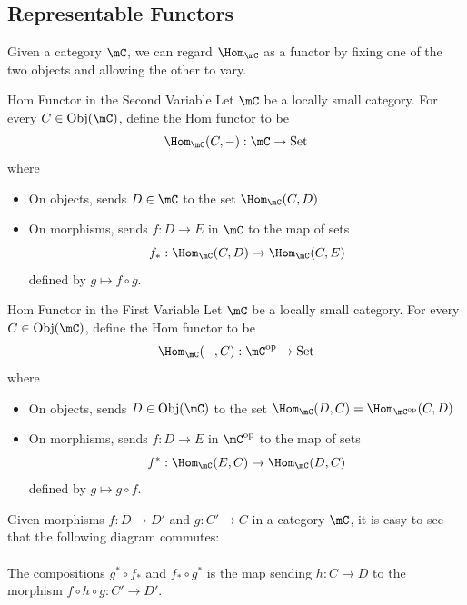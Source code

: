 \documentclass[a4paper]{article}
\begin{document}
\subsection{Representable Functors}
Given a category $\mC$, we can regard $\Hom_\mC$ as a functor by fixing one of the two objects and allowing the other to vary. 

\begin{defn}{Hom Functor in the Second Variable}{} Let $\mC$ be a locally small category. For every $C\in\text{Obj}(\mC)$, define the Hom functor to be $$\Hom_\mC(C,-):\mC\to\text{Set}$$ where 
\begin{itemize}
\item On objects, sends $D\in\mC$ to the set $\Hom_\mC(C,D)$
\item On morphisms, sends $f:D\to E$ in $\mC$ to the map of sets $$f_\ast:\Hom_\mC(C,D)\to\Hom_\mC(C,E)$$ defined by $g\mapsto f\circ g$. 
\end{itemize}
\end{defn}

\begin{defn}{Hom Functor in the First Variable}{} Let $\mC$ be a locally small category. For every $C\in\text{Obj}(\mC)$, define the Hom functor to be $$\Hom_\mC(-,C):\mC^\text{op}\to\text{Set}$$ where 
\begin{itemize}
\item On objects, sends $D\in\text{Obj}(\mC)$ to the set $\Hom_\mC(D,C)=\Hom_{\mC^{\text{op}}}(C,D)$
\item On morphisms, sends $f:D\to E$ in $\mC^{\text{op}}$ to the map of sets $$f^\ast:\Hom_\mC(E,C)\to\Hom_\mC(D,C)$$ defined by $g\mapsto g\circ f$. 
\end{itemize}
\end{defn}

Given morphisms $f:D\to D'$ and $g:C'\to C$ in a category $\mC$, it is easy to see that the following diagram commutes: \\
\\

The compositions $g^\ast\circ f_\ast$ and $f_\ast\circ g^\ast$ is the map sending $h:C\to D$ to the morphism $f\circ h\circ g:C'\to D'$. 
\end{document}

